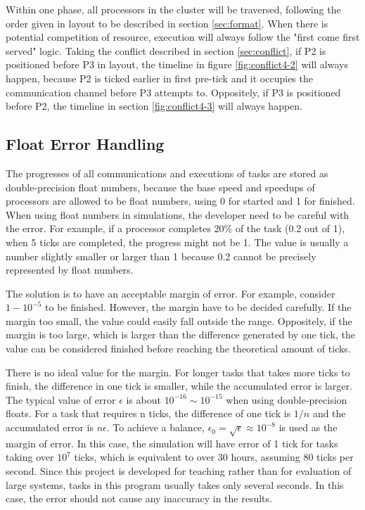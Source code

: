 \documentclass[msc,deptreport, cs]{infthesis}
\begin{document}
Within one phase, all processors in the cluster will be traversed, following the order given in layout to be described in section \ref{sec:format}. When there is potential competition of resource, execution will always follow the "first come first served" logic. Taking the conflict described in section \ref{sec:conflict}, if P2 is positioned before P3 in layout, the timeline in figure \ref{fig:conflict4-2} will always happen, because P2 is ticked earlier in first pre-tick and it occupies the communication channel before P3 attempts to. Oppositely, if P3 is positioned before P2, the timeline in section \ref{fig:conflict4-3} will always happen.

\subsection{Float Error Handling}

The progresses of all communications and executions of tasks are stored as double-precision float numbers, because the base speed and speedups of processors are allowed to be float numbers, using 0 for started and 1 for finished. When using float numbers in simulations, the developer need to be careful with the error. For example, if a processor completes 20\% of the task (0.2 out of 1), when 5 ticks are completed, the progress might not be 1. The value is usually a number slightly smaller or larger than 1 because 0.2 cannot be precisely represented by float numbers.

The solution is to have an acceptable margin of error. For example, consider $1 - 10^{-5}$ to be finished. However, the margin have to be decided carefully. If the margin too small, the value could easily fall outside the range. Oppositely, if the margin is too large, which is larger than the difference generated by one tick, the value can be considered finished before reaching the theoretical amount of ticks.

There is no ideal value for the margin. For longer tasks that takes more ticks to finish, the difference in one tick is smaller, while the accumulated error is larger. The typical value of error $\epsilon$ is about $10^{-16} \sim 10^{-15}$ when using double-precision floats. For a task that requires n ticks, the difference of one tick is $1/n$ and the accumulated error is $n\epsilon$. To achieve a balance, $\epsilon_0 = \sqrt{\epsilon} \approx 10^{-8}$ is used as the margin of error. In this case, the simulation will have error of 1 tick for tasks taking over $10^7$ ticks, which is equivalent to over 30 hours, assuming 80 ticks per second. Since this project is developed for teaching rather than for evaluation of large systems, tasks in this program usually takes only several seconds. In this case, the error should not cause any inaccuracy in the results. 
\end{document}
